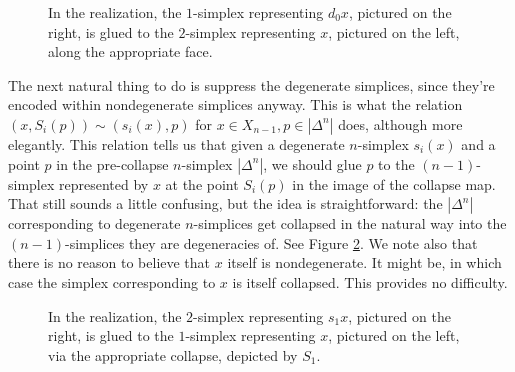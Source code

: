 \documentclass[12pt]{article}
\theoremstyle{plain}
\theoremstyle{definition}
\theoremstyle{remark}
\begin{document}
\begin{figure}[!htp]
\begin{center}
\end{center}
\caption{In the realization, the $1$-simplex representing $d_0x$, pictured on the right, is glued to the $2$-simplex representing $x$, pictured on the left, along the appropriate face.}\label{F: fig13}
\end{figure}

The next natural thing to do is suppress the degenerate simplices, since they're encoded within nondegenerate simplices anyway. This is what the relation $(x,S_i(p))\sim(s_i(x),p)$ for $x\in X_{n-1},p\in |\Delta^n|$ does, although more elegantly. This relation tells us that given a degenerate $n$-simplex $s_i(x)$ and a point $p$ in the pre-collapse $n$-simplex $|\Delta^n|$, we should glue $p$ to the $(n-1)$-simplex represented by $x$ at the point $S_i(p)$ in the image of the collapse map. That still sounds a little confusing, but the idea is straightforward: the $|\Delta^n|$ corresponding to degenerate $n$-simplices get collapsed in the natural way into the $(n-1)$-simplices they are degeneracies of. See Figure \ref{F: fig14}. We note also that there is no reason to believe that $x$ itself is nondegenerate. It might be, in which case the simplex corresponding to $x$ is itself collapsed. This provides no difficulty.



\begin{figure}[!htp]
\begin{center}
\end{center}
\caption{In the realization, the $2$-simplex representing $s_1x$, pictured on the right, is glued to the $1$-simplex representing $x$, pictured on the left, via the appropriate collapse, depicted by $S_1$.}\label{F: fig14}
\end{figure}
\end{document}
